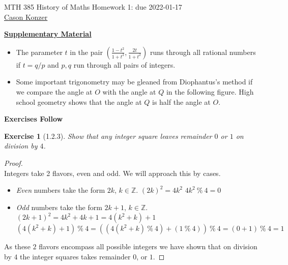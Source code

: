 \documentclass[10pt]{article}
\theoremstyle{plain}
\newtheorem{ex}{Exercise}
\begin{document}
MTH 385 \qquad History of Maths \qquad Homework 1: due 2022-01-17 \\
\color{purple}\underline{Cason Konzer}\color{black}

\hrulefill

\underline{\textbf{Supplementary Material}}
\color{blue}

\begin{itemize}
  \item The parameter $t$ in the pair $\displaystyle \left(\frac{1-t^2}{1+t^2},\frac{2t}{1+t^2}\right)$ runs through all rational numbers if $t=q/p$ and $p,q$ run through all pairs of integers.
  \item Some important trigonometry may be gleaned from Diophantus's method if we compare the angle at $O$ with the angle at $Q$ in the following figure. High school geometry shows that the angle at $Q$ is half the angle at $O$.
\end{itemize}

\color{black}

\begin{center}
\end{center}

\hrulefill

\begin{center}
  \textbf{Exercises Follow}
\end{center}

\newpage

\begin{ex} [1.2.3]
  Show that any integer square leaves remainder $0$ or $1$ on division by $4$.
\end{ex}

\begin{proof}
  \ \\
  Integers take 2 flavors, even and odd. We will approach this by cases.
  \begin{itemize}
    \item \textit{Even} numbers take the form $2k$, $k \in \mathbb{Z} $.
    \subitem $(2k)^{2} = 4k^{2}$
    \subitem $4k^{2} \ \% \ {4} = 0$
    \item \textit{Odd} numbers take the form $2k+1$, $k \in \mathbb{Z} $.
    \subitem $(2k+1)^{2} = 4k^{2}+4k+1 = 4(k^{2}+k)+1$
    \subitem $(4(k^{2}+k)+1) \ \% \ {4} = ((4(k^{2}+k) \ \% \ {4})+(1 \ \% \ {4})) \ \% \ {4} = (0+1) \ \% \ {4} = 1$
  \end{itemize}
  As these $2$ flavors encompass all possible integers we have shown that on division by $4$ the integer squares takes remainder $0$, or $1$.
\end{proof}
\end{document}
